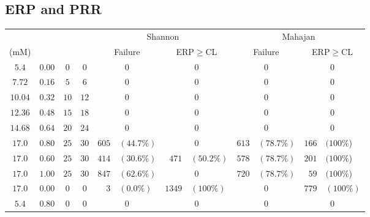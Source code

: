 \documentclass[../thesis-main.tex]{subfiles}
\begin{document}
\subsection{ERP and PRR}
\label{subsec:isch-erpprr-response}

\begin{table}
 \centering
 \begin{tabular}{cccc|r@{ }lr@{ }l|r@{ }lr@{ }l}
  \ko{}	& \multirow{2}{*}{\fkatp{}}	& \multirow{2}{*}{\finhib{}}	& \multirow{2}{*}{\fna{}}	& \multicolumn{4}{c|}{Shannon}	& \multicolumn{4}{c}{Mahajan}	\\
  (mM)	&	&	&	& \multicolumn{2}{c}{Failure}	& \multicolumn{2}{c|}{ERP$\ge$CL}	& \multicolumn{2}{c}{Failure}	& \multicolumn{2}{c}{ERP$\ge$CL}	\\
  \hline
  \hline
  $5.4$		& $0.00$	& $0$	& $0$	& \multicolumn{2}{c}{$0$}	& \multicolumn{2}{c|}{$0$}	& \multicolumn{2}{c}{$0$}	& \multicolumn{2}{c}{$0$}	\\
  $7.72$	& $0.16$	& $5$	& $6$	& \multicolumn{2}{c}{$0$}	& \multicolumn{2}{c|}{$0$}	& \multicolumn{2}{c}{$0$}	& \multicolumn{2}{c}{$0$}	\\
  $10.04$	& $0.32$	& $10$	& $12$	& \multicolumn{2}{c}{$0$}	& \multicolumn{2}{c|}{$0$}	& \multicolumn{2}{c}{$0$}	& \multicolumn{2}{c}{$0$}	\\
  $12.36$	& $0.48$	& $15$	& $18$	& \multicolumn{2}{c}{$0$}	& \multicolumn{2}{c|}{$0$}	& \multicolumn{2}{c}{$0$}	& \multicolumn{2}{c}{$0$}	\\
  $14.68$	& $0.64$	& $20$	& $24$	& \multicolumn{2}{c}{$0$}	& \multicolumn{2}{c|}{$0$}	& \multicolumn{2}{c}{$0$}	& \multicolumn{2}{c}{$0$}	\\
  $17.0$	& $0.80$	& $25$	& $30$	& $605$		& $(44.7\%)$	& \multicolumn{2}{c|}{$0$}	& $613$		& $(78.7\%)$	& $166$		& $(100\%$)	\\
  \hline
  $17.0$	& $0.60$	& $25$	& $30$	& $414$		& $(30.6\%)$	& $471$		& $(50.2\%)$	& $578$		& $(78.7\%)$	& $201$		& $(100\%$)	\\
  $17.0$	& $1.00$	& $25$	& $30$	& $847$		& $(62.6\%)$	& \multicolumn{2}{c|}{$0$}	& $720$		& $(78.7\%)$	& $59$		& $(100\%$)	\\
  \hline
  $17.0$	& $0.00$	& $0$	& $0$	& $3$		& $(0.0\%)$	& $1349$	& $(100\%)$	& \multicolumn{2}{c}{$0$}	& $779$		& $(100\%)$	\\
  $5.4$		& $0.80$	& $0$	& $0$	& \multicolumn{2}{c}{$0$}	& \multicolumn{2}{c|}{$0$}	& \multicolumn{2}{c}{$0$}	& \multicolumn{2}{c}{$0$}	\\

\end{tabular}
\end{table}
\end{document}
